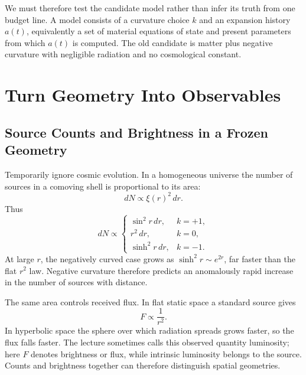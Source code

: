 \begin{classroomqa}
\end{classroomqa}

We must therefore test the candidate model rather than infer its truth from one budget line. A model consists of a curvature choice \(k\) and an expansion history \(a(t)\), equivalently a set of material equations of state and present parameters from which \(a(t)\) is computed. The old candidate is matter plus negative curvature with negligible radiation and no cosmological constant.

\section{Turn Geometry Into Observables}

\subsection{Source Counts and Brightness in a Frozen Geometry}

Temporarily ignore cosmic evolution. In a homogeneous universe the number of sources in a comoving shell is proportional to its area:
\begin{equation}
dN\propto \xi(r)^2\,dr.
\label{eq:c06-shell-count}
\end{equation}
Thus
\begin{equation}
dN\propto
\begin{cases}
\sin^2r\,dr, & k=+1,\\
r^2\,dr, & k=0,\\
\sinh^2r\,dr, & k=-1.
\end{cases}
\end{equation}
At large \(r\), the negatively curved case grows as \(\sinh^2r\sim e^{2r}\), far faster than the flat \(r^2\) law. Negative curvature therefore predicts an anomalously rapid increase in the number of sources with distance.

The same area controls received flux. In flat static space a standard source gives
\begin{equation}
F\propto\frac{1}{r^2}.
\end{equation}
In hyperbolic space the sphere over which radiation spreads grows faster, so the flux falls faster. The lecture sometimes calls this observed quantity luminosity; here \(F\) denotes brightness or flux, while intrinsic luminosity belongs to the source. Counts and brightness together can therefore distinguish spatial geometries.

